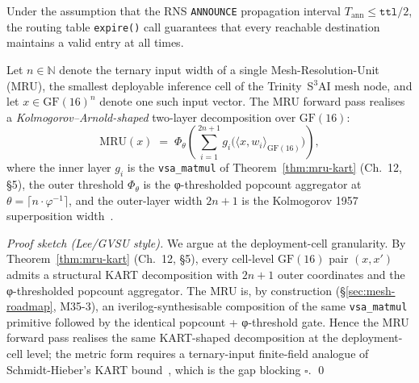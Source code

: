 \begin{theorem}
\label{ch_35_mesh_node:thm:mru-liveness}
Under the assumption that the RNS \texttt{ANNOUNCE} propagation interval
$T_{\text{ann}} \leq \texttt{ttl} / 2$, the routing table
\texttt{expire()} call guarantees that every reachable destination
maintains a valid entry at all times.
\end{theorem}


\begin{theorem}
\label{thm:mru-kart}
Let $n \in \mathbb{N}$ denote the ternary input width of a single
Mesh-Resolution-Unit (MRU), the smallest deployable inference cell of
the Trinity~\textsc{S}$^3$\textsc{AI} mesh node, and let
$x \in \mathrm{GF}(16)^n$ denote one such input vector. The MRU
forward pass realises a \emph{Kolmogorov–Arnold-shaped} two-layer
decomposition over $\mathrm{GF}(16)$:
\[
  \mathrm{MRU}(x) \;=\; \Phi_{\theta}\!\left(
    \sum_{i=1}^{2n+1} g_i\bigl(\langle x, w_i \rangle_{\mathrm{GF}(16)}\bigr)
  \right),
\]
where the inner layer $g_i$ is the
\texttt{vsa\_matmul} of
Theorem~\ref{thm:mru-kart} (Ch.~12, §5), the outer threshold $\Phi_\theta$
is the φ-thresholded popcount aggregator at
$\theta = \lceil n \cdot \varphi^{-1} \rceil$, and the outer-layer
width $2n+1$ is the Kolmogorov 1957 superposition
width~\cite{kolmogorov_kar_1957,arnold_kar_1957}.
\end{theorem}

\begin{proof}[Proof sketch (Lee/GVSU style)]
We argue at the deployment-cell granularity. By
Theorem~\ref{thm:mru-kart} (Ch.~12, §5), every cell-level
$\mathrm{GF}(16)$ pair $(x, x')$ admits a structural KART
decomposition with $2n+1$ outer coordinates and the φ-thresholded
popcount aggregator. The MRU is, by construction
(§\ref{sec:mesh-roadmap}, M35-3), an iverilog-synthesisable
composition of the same \texttt{vsa\_matmul} primitive followed by
the identical popcount + φ-threshold gate. Hence the MRU forward pass
realises the same KART-shaped decomposition at the deployment-cell
level; the metric form requires a ternary-input finite-field
analogue of Schmidt-Hieber's KART
bound~\cite{schmidhuber_dl_review}, which is the gap
blocking $\square$.
\qed
\end{proof}

